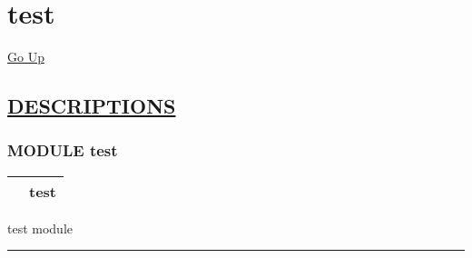 \chapter*{\color{headfile}
test
}
\hypertarget{ecldoc:toc:test}{}
\hyperlink{ecldoc:toc:root}{Go Up}


\section*{\underline{\textsf{DESCRIPTIONS}}}
\subsection*{\textsf{\colorbox{headtoc}{\color{white} MODULE}
test}}

\hypertarget{ecldoc:test}{}

{\renewcommand{\arraystretch}{1.5}
\begin{tabularx}{\textwidth}{|>{\raggedright\arraybackslash}l|X|}
\hline
\hspace{0pt}\mytexttt{\color{red} } & \textbf{test} \\
\hline
\end{tabularx}
}

\par





test module







\rule{\linewidth}{0.5pt}
